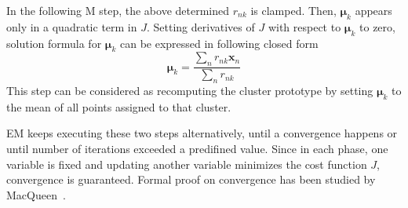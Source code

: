 In the following M step, the above determined \(r_{nk}\) is clamped. Then, \(\boldsymbol{\mu}_k\) appears only in a quadratic term in \(J\). Setting derivatives of \(J\) with respect to \(\boldsymbol{\mu}_k\) to zero, solution formula for \(\boldsymbol{\mu}_k\) can be expressed in following closed form
\begin{equation}
	\label{eq:muupdate}
	\boldsymbol{\mu}_{k} = \frac{\sum_n r_{nk}\mathbf{x}_n}{\sum_n r_{nk}}
\end{equation}
This step can be considered as recomputing the cluster prototype by setting \(\boldsymbol{\mu}_k\) to the mean of all points assigned to that cluster. 

EM keeps executing these two steps alternatively, until a convergence happens or until number of iterations exceeded a predifined value. Since in each phase, one variable is fixed and updating another variable minimizes the cost function \(J\), convergence is guaranteed. Formal proof on convergence has been studied by MacQueen~\cite{macqueen1967some}.

